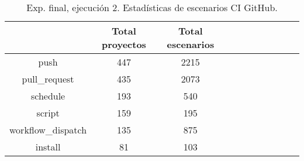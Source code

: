 \begin{table}[h]
  \centering
  \caption{Exp. final, ejecución 2. Estadísticas de escenarios CI GitHub.}
  \label{tab:tabla_f2_5}

\begin{footnotesize}
\renewcommand{\arraystretch}{1.5} %
\begin{tabular}{ccccccccccc}
  \hline
  {} &  Total proyectos &  Total escenarios \\
  \hline
  push                        &                 447 &          2215 \\
  pull\_request                &                 435 &          2073 \\
  schedule                    &                 193 &           540 \\
  script                      &                 159 &           195 \\
  workflow\_dispatch           &                 135 &           875 \\
  install                     &                  81 &           103 \\

\end{tabular}
\end{footnotesize}
\end{table}
